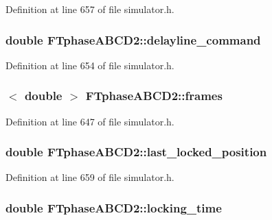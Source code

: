 Definition at line 657 of file simulator.h.

\hypertarget{classFTphaseABCD2_ad0b7d3d7f37985784b661e7799f6bfb8}{
\subsubsection[{delayline\_\-command}]{\setlength{\rightskip}{0pt plus 5cm}double {\bf FTphaseABCD2::delayline\_\-command}}}
\label{classFTphaseABCD2_ad0b7d3d7f37985784b661e7799f6bfb8}


Definition at line 654 of file simulator.h.

\hypertarget{classFTphaseABCD2_a7f5db202b968674feedc37d14223c9a0}{
\subsubsection[{frames}]{$<$ double $>$ {\bf FTphaseABCD2::frames}}}
\label{classFTphaseABCD2_a7f5db202b968674feedc37d14223c9a0}


Definition at line 647 of file simulator.h.

\hypertarget{classFTphaseABCD2_aa33e5daa90e087e8ecac49c52faeb159}{
\subsubsection[{last\_\-locked\_\-position}]{\setlength{\rightskip}{0pt plus 5cm}double {\bf FTphaseABCD2::last\_\-locked\_\-position}}}
\label{classFTphaseABCD2_aa33e5daa90e087e8ecac49c52faeb159}


Definition at line 659 of file simulator.h.

\hypertarget{classFTphaseABCD2_aeb70a3ae3fc50fae22b78c4ab13ab7fb}{
\subsubsection[{locking\_\-time}]{\setlength{\rightskip}{0pt plus 5cm}double {\bf FTphaseABCD2::locking\_\-time}}}
\label{classFTphaseABCD2_aeb70a3ae3fc50fae22b78c4ab13ab7fb}



